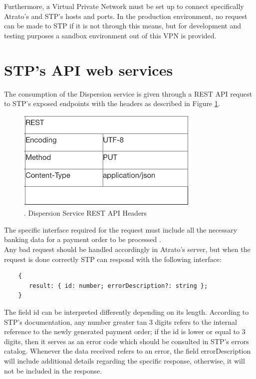 Furthermore, a Virtual Private Network must be set up to connect specifically Atrato’s and STP’s hosts and ports. In the production environment, no request can be made to STP if it is not through this means, but for development and testing purposes a sandbox environment out of this VPN is provided.

\section{STP’s API web services}

The consumption of the Dispersion service is given through a REST API request to STP’s exposed endpoints with the headers as described in Figure \ref{fig:STPRequestParams}.

\begin{figure} [h!]
    \centering
    \includegraphics[scale = 1]{assets/diagrams/STPRequestParams.png}
    \caption{. Dispersion Service REST API Headers}\label{fig:STPRequestParams}
\end{figure}

The specific interface required for the request must include all the necessary banking data for a payment order to be processed \cite{stp}.\\

Any bad request should be handled accordingly in Atrato’s server, but when the request is done correctly STP can respond with the following interface:

\begin{verbatim}
    {
       result: { id: number; errorDescription?: string }; 
    }
\end{verbatim}
  
The field id can be interpreted differently depending on its length. According to STP’s documentation, any number greater tan 3 digits refers to the internal reference to the newly generated payment order; if the id is lower or equal to 3 digits, then it serves as an error code which should be consulted in STP’s errors catalog. Whenever the data received refers to an error, the field errorDescription will include additional details regarding the specific response, otherwise, it will not be included in the response.\\

